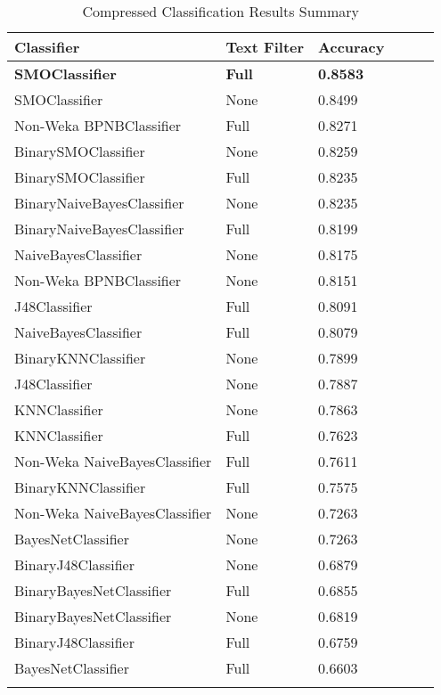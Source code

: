 \begin{center}
   \begin{longtable}{|l|l|l|c|c|c|}
      \hline
         Classifier & Text Filter & Accuracy
      \tabularnewline\hline
         \textbf{SMOClassifier} & \textbf{Full} & \textbf{0.8583}
      \tabularnewline\hline
         SMOClassifier & None & 0.8499
      \tabularnewline\hline
         Non-Weka BPNBClassifier & Full & 0.8271
      \tabularnewline\hline
         BinarySMOClassifier & None & 0.8259
      \tabularnewline\hline
         BinarySMOClassifier & Full & 0.8235
      \tabularnewline\hline
         BinaryNaiveBayesClassifier & None & 0.8235
      \tabularnewline\hline
         BinaryNaiveBayesClassifier & Full & 0.8199
      \tabularnewline\hline
         NaiveBayesClassifier & None & 0.8175
      \tabularnewline\hline
         Non-Weka BPNBClassifier & None & 0.8151
      \tabularnewline\hline
         J48Classifier & Full & 0.8091
      \tabularnewline\hline
         NaiveBayesClassifier & Full & 0.8079
      \tabularnewline\hline
         BinaryKNNClassifier & None & 0.7899
      \tabularnewline\hline
         J48Classifier & None & 0.7887
      \tabularnewline\hline
         KNNClassifier & None & 0.7863
      \tabularnewline\hline
         KNNClassifier & Full & 0.7623
      \tabularnewline\hline
         Non-Weka NaiveBayesClassifier & Full & 0.7611
      \tabularnewline\hline
         BinaryKNNClassifier & Full & 0.7575
      \tabularnewline\hline
         Non-Weka NaiveBayesClassifier & None & 0.7263
      \tabularnewline\hline
         BayesNetClassifier & None & 0.7263
      \tabularnewline\hline
         BinaryJ48Classifier & None & 0.6879
      \tabularnewline\hline
         BinaryBayesNetClassifier & Full & 0.6855
      \tabularnewline\hline
         BinaryBayesNetClassifier & None & 0.6819
      \tabularnewline\hline
         BinaryJ48Classifier & Full & 0.6759
      \tabularnewline\hline
         BayesNetClassifier & Full & 0.6603
      \tabularnewline\hline
      \caption[Compressed Classification Results Summary]{Compressed Classification Results Summary}
      \label{table:classification-summary-compressed}
   \end{longtable}
\end{center}

